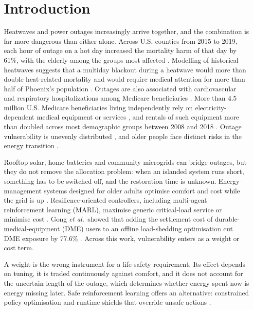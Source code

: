 \documentclass[conference]{IEEEtran}
\begin{document}
\section{Introduction}
Heatwaves and power outages increasingly arrive together, and the combination is far more dangerous than either alone. Across U.S. counties from 2015 to 2019, each hour of outage on a hot day increased the mortality harm of that day by 61\%, with the elderly among the groups most affected \cite{ai2025heat}. Modelling of historical heatwaves suggests that a multiday blackout during a heatwave would more than double heat-related mortality and would require medical attention for more than half of Phoenix's population \cite{stone2023blackouts}. Outages are also associated with cardiovascular and respiratory hospitalizations among Medicare beneficiaries \cite{mcbrien2026outages}. More than 4.5 million U.S. Medicare beneficiaries living independently rely on electricity-dependent medical equipment or services \cite{empower}, and rentals of such equipment more than doubled across most demographic groups between 2008 and 2018 \cite{casey2021dme}. Outage vulnerability is unevenly distributed \cite{dugan2025survey,ezzati2025porsvi}, and older people face distinct risks in the energy transition \cite{zuk2024ageism}.

Rooftop solar, home batteries and community microgrids can bridge outages, but they do not remove the allocation problem: when an islanded system runs short, something has to be switched off, and the restoration time is unknown. Energy-management systems designed for older adults optimise comfort and cost while the grid is up \cite{athanasiadis2022sems,tsaknakis2023nearly,kaculi2025human}. Resilience-oriented controllers, including multi-agent reinforcement learning (MARL), maximise generic critical-load service or minimise cost \cite{wu2026marl,qiu2023repair,esan2026lean}. Gong \textit{et al.}\ showed that adding the settlement cost of durable-medical-equipment (DME) users to an offline load-shedding optimisation cut DME exposure by 77.6\% \cite{gong2026dilemma}. Across this work, vulnerability enters as a weight or cost term.

A weight is the wrong instrument for a life-safety requirement. Its effect depends on tuning, it is traded continuously against comfort, and it does not account for the uncertain length of the outage, which determines whether energy spent now is energy missing later. Safe reinforcement learning offers an alternative: constrained policy optimisation \cite{achiam2017cpo,stooke2020pid} and runtime shields that override unsafe actions \cite{alshiekh2018shield}.
\end{document}

